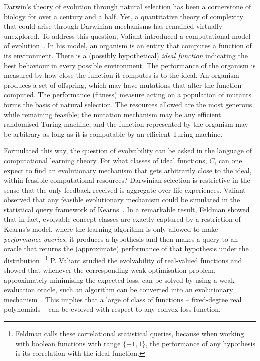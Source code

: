 Darwin's theory of evolution through natural selection has been a cornerstone of
biology for over a century and a half. Yet, a quantitative theory of complexity
that could arise through Darwinian mechanisms has remained virtually unexplored.
To address this question, Valiant introduced a computational model of
evolution~\cite{Valiant:2009-evolvability}.  In his model, an organism is an
entity that computes a function of its environment.  There is a (possibly
hypothetical) \emph{ideal function} indicating the best behaviour in every
possible environment. The performance of the organism is measured by how close
the function it computes is to the ideal. An organism produces a set of
offspring, which may have mutations that  alter the function computed. The
performance (fitness) measure acting on a population of mutants forms the basis
of natural selection. The resources allowed are the most generous while
remaining feasible; the mutation mechanism may be any efficient randomised
Turing machine, and the function represented by the organism may be arbitrary as
long as it is computable by an efficient Turing machine.

Formulated this way, the question of evolvability can be asked in the language
of computational learning theory. For what classes of ideal functions, $C$, can
one expect to find an evolutionary mechanism that gets arbitrarily close to the
ideal, within feasible computational resources? Darwinian selection is
restrictive in the sense that the only feedback received is aggregate over life
experiences. Valiant observed that any feasible evolutionary mechanism could be
simulated in the statistical query framework of Kearns~\cite{Kearns:1998}. In a
remarkable result, Feldman showed that in fact, evolvable concept classes are
exactly captured by a restriction of Kearns's model, where the learning
algorithm is only allowed to make \emph{performance queries}, \ie it produces a
hypothesis and then makes a query to an oracle that returns the (approximate)
performance of that hypothesis under the
distribution~\cite{Feldman:2008-evolvability}.\footnote{Feldman calls these
correlational statistical queries, because when working with boolean
functions with range $\{-1, 1\}$, the performance of any hypothesis is its
correlation with the ideal function.} P.  Valiant studied the evolvability of
real-valued functions and showed that whenever the corresponding weak
optimisation problem, \ie approximately minimising the expected loss, can be
solved by using a weak evaluation oracle, such an algorithm can be converted
into an evolutionary mechanism~\cite{Valiant:2012-real}. This implies that a
large of class of functions -- fixed-degree real polynomials -- can be evolved
with respect to any convex loss function.

